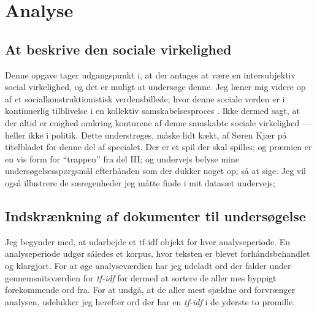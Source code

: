 \renewcommand*{\afterpartskip}{
\vfil
\begin{epigraphs}
\qitem{\itshape
“Jo, hvis dét skal kaldes Fakta, saa benægter a Fakta!”
}{folketingsmedlem Søren Kjær, i debat med Carl Steen Andersen Bille}
\qitem{\itshape
  Politik skal ikke videnskabeliggøres. Der findes ikke noget facit i politik – kun følelser og holdninger. Begreber som sandt og falsk eller godt og ondt har ganske enkelt ikke hjemme i det politiske rum. 
}{Peter Skaarup, i et ugebrev for Dansk Folkeparti, \citeyear{skaarupPolitikErForst2017}}
\end{epigraphs}}

\part{Analyse}\label{part:analysis}

\chapter{At beskrive den sociale virkelighed}


Denne opgave tager udgangspunkt i, at der antages at være en intersubjektiv social virkelighed, og det er muligt at undersøge denne.
Jeg læner mig videre op af et socialkonstruktionistisk verdensbillede; hvor denne sociale verden er i kontinuerlig tilblivelse i en kollektiv samskabelsesproces .
Ikke dermed sagt, at der altid er enighed omkring konturene af denne samskabte sociale virkelighed — heller ikke i politik.
Dette understreges, måske lidt kækt, af Søren Kjær på titelbladet for denne del af specialet.
Der er et spil der skal spilles; og præmien er en vis form for  “trappen” fra del III; og undervejs belyse mine undersøgelsesspørgsmål efterhånden som der dukker noget op; så at sige.
Jeg vil også illustrere de særegenheder jeg måtte finde i mit datasæt undervejs; 

\chapter{Indskrænkning af dokumenter til undersøgelse}

Jeg begynder med, at udarbejde et tf-idf objekt for hver analyseperiode.
En analyseperiode udgør således et korpus, hvor teksten er blevet forhåndsbehandlet og klargjort.
For at øge analyseværdien har jeg udeladt ord der falder under gennemsnitsværdien for \textit{tf-idf} for dermed at sortere de aller mes hyppigt forekommende ord fra.
For at undgå, at de aller mest sjældne ord forvrænger analysen, udelukker jeg herefter ord der har en \textit{tf-idf} i de yderste to promille.

